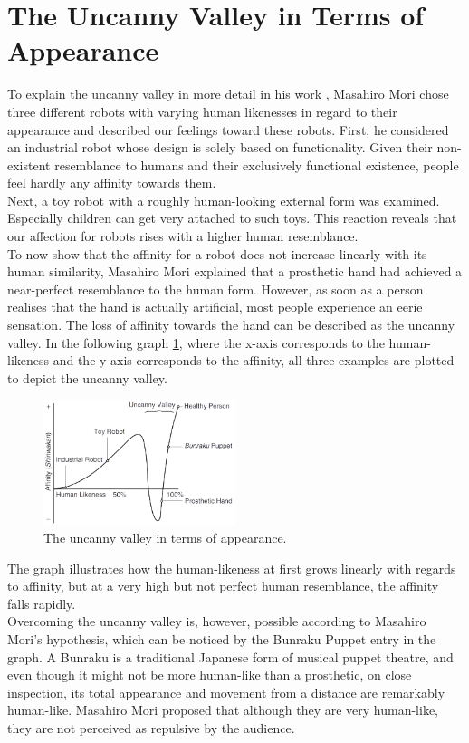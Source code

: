\section{The Uncanny Valley in Terms of Appearance}
To explain the uncanny valley in more detail in his work \cite{original_masahiro}, Masahiro Mori chose three different robots with varying human likenesses in regard to their appearance and described our feelings toward these robots. First, he considered an industrial robot whose design is solely based on functionality. Given their non-existent resemblance to humans and their exclusively functional existence, people feel hardly any affinity towards them.\\
Next, a toy robot with a roughly human-looking external form was examined. Especially children can get very attached to such toys. This reaction reveals that our affection for robots rises with a higher human resemblance.\\
To now show that the affinity for a robot does not increase linearly with its human similarity, Masahiro Mori explained that a prosthetic hand had achieved a near-perfect resemblance to the human form. However, as soon as a person realises that the hand is actually artificial, most people experience an eerie sensation. The loss of affinity towards the hand can be described as the uncanny valley.
In the following graph \ref{fig:uv_appearance}, where the x-axis corresponds to the human-likeness and the y-axis corresponds to the affinity, all three examples are plotted to depict the uncanny valley. 
\begin{figure} %
    \centering
    \includegraphics[width=0.5\textwidth]{graphics/uv_appearance.png}
    \caption{The uncanny valley in terms of appearance.}
    \label{fig:uv_appearance}
\end{figure}
The graph illustrates how the human-likeness at first grows linearly with regards to affinity, but at a very high but not perfect human resemblance, the affinity falls rapidly.\\ 
Overcoming the uncanny valley is, however, possible according to Masahiro Mori's hypothesis, which can be noticed by the Bunraku Puppet entry in the graph. A Bunraku is a traditional Japanese form of musical puppet theatre, and even though it might not be more human-like than a prosthetic, on close inspection, its total appearance and movement from a distance are remarkably human-like. Masahiro Mori proposed that although they are very human-like, they are not perceived as repulsive by the audience.

